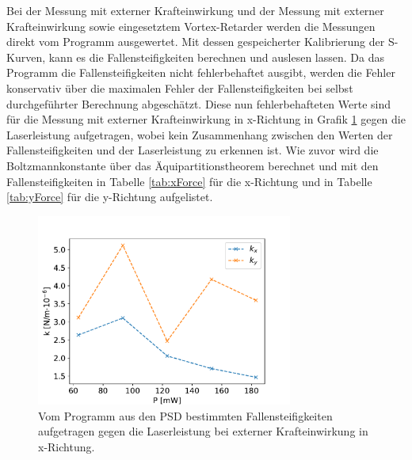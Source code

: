             Bei der Messung mit externer Krafteinwirkung und der Messung mit externer Krafteinwirkung sowie eingesetztem Vortex-Retarder werden die Messungen direkt vom Programm ausgewertet.
            Mit dessen gespeicherter Kalibrierung der S-Kurven, kann es die Fallensteifigkeiten berechnen und auslesen lassen. Da das Programm die Fallensteifigkeiten nicht fehlerbehaftet ausgibt, werden die 
            Fehler konservativ über die maximalen Fehler der Fallensteifigkeiten bei selbst durchgeführter Berechnung abgeschätzt. Diese nun fehlerbehafteten Werte sind für die Messung mit
            externer Krafteinwirkung in x-Richtung in Grafik \ref{fig:k_xForce} gegen die Laserleistung aufgetragen, wobei kein Zusammenhang zwischen den Werten der Fallensteifigkeiten und der Laserleistung 
            zu erkennen ist. Wie zuvor wird die Boltzmannkonstante über das Äquipartitionstheorem berechnet und mit den Fallensteifigkeiten in Tabelle \ref{tab:xForce} für die x-Richtung und in Tabelle 
            \ref{tab:yForce} für die y-Richtung aufgelistet. 
            \begin{figure}[h]
            \centering
            \includegraphics[width = 0.75\textwidth]{k_xForce.pdf}
            \caption{Vom Programm aus den PSD bestimmten Fallensteifigkeiten aufgetragen gegen die Laserleistung bei externer Krafteinwirkung in x-Richtung.}
            \label{fig:k_xForce}
            \end{figure}
            \FloatBarrier
